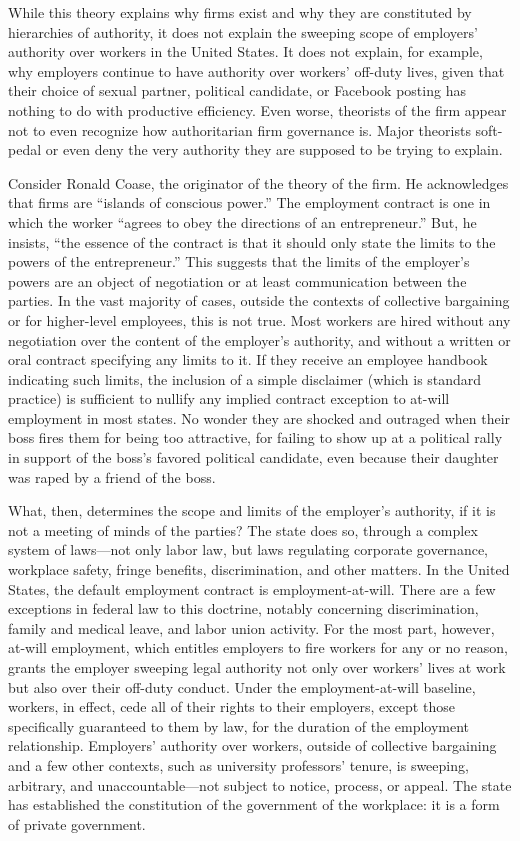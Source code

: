 \documentclass[
  letterpaper,
  11pt,
  DIV=9,
  openright]{scrbook}
\begin{document}
While this theory explains why firms exist and why they are constituted
by hierarchies of authority, it does not explain the sweeping scope of
employers' authority over workers in the United States. It does not
explain, for example, why employers continue to have authority over
workers' off-duty lives, given that their choice of sexual partner,
political candidate, or Facebook posting has nothing to do with
productive efficiency. Even worse, theorists of the firm appear not to
even recognize how authoritarian firm governance is. Major theorists
soft-pedal or even deny the very authority they are supposed to be
trying to explain.

Consider Ronald Coase, the originator of the theory of the firm. He
acknowledges that firms are ``islands of conscious power.'' The
employment contract is one in which the worker ``agrees to obey the
directions of an entrepreneur.'' But, he insists, ``the essence of the
contract is that it should only state the limits to the powers of the
entrepreneur.'' This suggests that the limits of the employer's powers
are an object of negotiation or at least communication between the
parties. In the vast majority of cases, outside the contexts of
collective bargaining or for higher-level employees, this is not true.
Most workers are hired without any negotiation over the content of the
employer's authority, and without a written or oral contract specifying
any limits to it. If they receive an employee handbook indicating such
limits, the inclusion of a simple disclaimer (which is standard
practice) is sufficient to nullify any implied contract exception to
at-will employment in most states. No wonder they are shocked and
outraged when their boss fires them for being too attractive, for
failing to show up at a political rally in support of the boss's favored
political candidate, even because their daughter was raped by a friend
of the boss.

What, then, determines the scope and limits of the employer's authority,
if it is not a meeting of minds of the parties? The state does so,
through a complex system of laws---not only labor law, but laws
regulating corporate governance, workplace safety, fringe benefits,
discrimination, and other matters. In the United States, the default
employment contract is employment-at-will. There are a few exceptions in
federal law to this doctrine, notably concerning discrimination, family
and medical leave, and labor union activity. For the most part, however,
at-will employment, which entitles employers to fire workers for any or
no reason, grants the employer sweeping legal authority not only over
workers' lives at work but also over their off-duty conduct. Under the
employment-at-will baseline, workers, in effect, cede all of their
rights to their employers, except those specifically guaranteed to them
by law, for the duration of the employment relationship. Employers'
authority over workers, outside of collective bargaining and a few other
contexts, such as university professors' tenure, is sweeping, arbitrary,
and unaccountable---not subject to notice, process, or appeal. The state
has established the constitution of the government of the workplace: it
is a form of private government.
\end{document}
